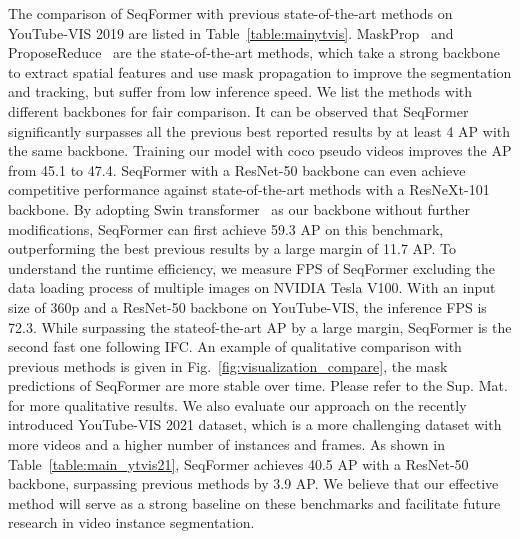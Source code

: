 \documentclass[runningheads]{llncs}
\begin{document}
The comparison of SeqFormer with previous state-of-the-art methods on YouTube-VIS 2019 are listed in Table~\ref{table:mainytvis}. 
MaskProp~\cite{MaskProp} and ProposeReduce~\cite{ProposeReduce} are the state-of-the-art methods, which take a strong backbone to extract spatial features and use mask propagation to improve the segmentation and tracking, but suffer from low inference speed.
We list the methods with different backbones for fair comparison. It can be observed that SeqFormer significantly surpasses all the previous best reported results by at least 4 AP with the same backbone. 
Training our model with coco pseudo videos improves the AP from 45.1 to 47.4. 
SeqFormer with a ResNet-50 backbone can even achieve competitive performance against state-of-the-art methods with a ResNeXt-101 backbone. By adopting Swin transformer~\cite{swin} as our backbone without further modifications, SeqFormer can first achieve 59.3 AP on this benchmark, outperforming the best previous results by a large margin of 11.7 AP. 
To understand the runtime efficiency, we measure FPS of SeqFormer excluding the data loading process of multiple images on NVIDIA Tesla V100. With an input size of 360p and a ResNet-50 backbone on YouTube-VIS, the inference FPS is 72.3. While surpassing the stateof-the-art AP by a large margin, SeqFormer is the second fast one following IFC.
An example of qualitative comparison with previous methods is given in Fig.~\ref{fig:visualization_compare}, the mask predictions of SeqFormer are more stable over time.
Please refer to the Sup. Mat. for more qualitative results.
We also evaluate our approach on the recently introduced YouTube-VIS 2021 dataset, which is a more challenging dataset with more videos and a higher number of instances and frames. As shown in Table~\ref{table:main_ytvis21}, SeqFormer achieves 40.5 AP with a ResNet-50 backbone, surpassing previous methods by 3.9 AP.
We believe that our effective method will serve as a strong baseline on these benchmarks and facilitate future research in video instance segmentation.
\end{document}
